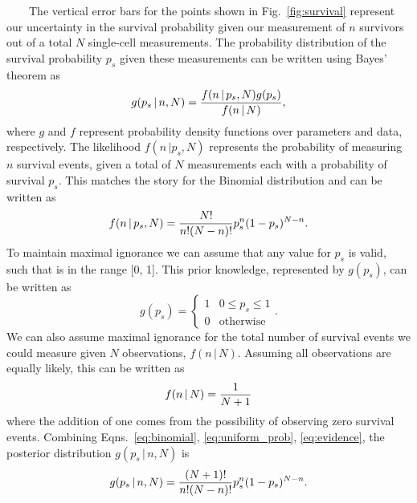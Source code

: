 ~~~~The
vertical
error
bars
for
the
points
shown
in
Fig.~\ref{fig:survival}
represent
our
uncertainty
in the
survival
probability
given
our
measurement
of
\(n\)
survivors
out of
a
total
\(N\)
single-cell
measurements.
The
probability
distribution
of the
survival
probability
\(p_s\)
given
these
measurements
can be
written
using
Bayes'
theorem
as
\begin{equation}
g(p_s\,\vert\, n, N) = {f(n\,\vert\,p_s, N)g(p_s) \over f(n\,\vert\, N)},
\label{eq:probability_bayes}\end{equation}
where
\(g\)
and
\(f\)
represent
probability
density
functions
over
parameters
and
data,
respectively.
The
likelihood
\(f(n\,\vert p_s, N)\)
represents
the
probability
of
measuring
\(n\)
survival
events,
given
a
total
of
\(N\)
measurements
each
with a
probability
of
survival
\(p_s\).
This
matches
the
story
for
the
Binomial
distribution
and
can be
written
as
\begin{equation}
f(n\,\vert\,p_s, N) = {N! \over n!(N - n)!}p_s^n(1 - p_s)^{N - n}.
\label{eq:binomial}\end{equation}
To
maintain
maximal
ignorance
we can
assume
that
any
value
for
\(p_s\)
is
valid,
such
that
is in
the
range
{[}0,
1{]}.
This
prior
knowledge,
represented
by
\(g(p_s)\),
can be
written
as
\begin{equation}
g(p_s) = \begin{cases}1 & 0\leq p_s\leq 1 \\
0 & \text{otherwise} \end{cases}.
\label{eq:uniform_prob}\end{equation}
We can
also
assume
maximal
ignorance
for
the
total
number
of
survival
events
we
could
measure
given
\(N\)
observations,
\(f(n\, \vert\, N)\).
Assuming
all
observations
are
equally
likely,
this
can be
written
as
\begin{equation}
f(n\,\vert\, N) = {1 \over N + 1}
\label{eq:evidence}\end{equation}
where
the
addition
of one
comes
from
the
possibility
of
observing
zero
survival
events.
Combining
Eqns.~\ref{eq:binomial}, \ref{eq:uniform_prob}, \ref{eq:evidence},
the
posterior
distribution
\(g(p_s\,\vert\, n, N)\)
is
\begin{equation}
g(p_s\,\vert\, n, N) = {(N+1)! \over n!(N - n)!}p_s^{n}(1 - p_s)^{N - n}.
\label{eq:probability_posterior}\end{equation}

